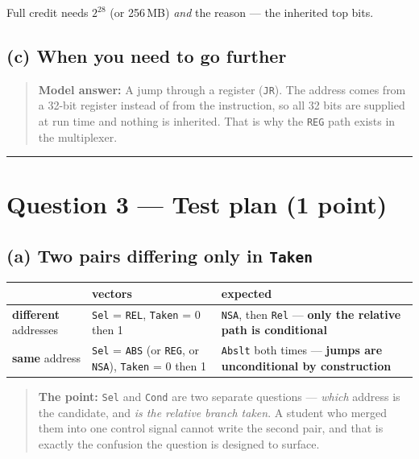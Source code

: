 \documentclass[11pt]{article}
\newcommand{\code}[1]{\texttt{#1}}
\newcommand{\hr}{\vspace{2pt}\hrule\vspace{6pt}}
\begin{document}
Full credit needs $2^{28}$ (or 256\,MB) \emph{and} the reason --- the inherited
top bits.

\subsection*{(c) When you need to go further}

\begin{quote}
\textbf{Model answer:} A jump through a register (\code{JR}). The address comes
from a 32-bit register instead of from the instruction, so all 32 bits are
supplied at run time and nothing is inherited. That is why the \code{REG} path
exists in the multiplexer.
\end{quote}

\vspace{4pt}\hr

\section*{Question 3 --- Test plan (1 point)}

\subsection*{(a) Two pairs differing only in \code{Taken}}

\begin{center}
\small
\begin{tabular}{l>{\raggedright\arraybackslash}p{5.0cm}>{\raggedright\arraybackslash}p{6.4cm}}
\toprule
& vectors & expected \\
\midrule
\textbf{different} addresses & \code{Sel} = \code{REL}, \code{Taken} = 0 then 1 & \code{NSA}, then \code{Rel} --- \textbf{only the relative path is conditional} \\
\textbf{same} address & \code{Sel} = \code{ABS} (or \code{REG}, or \code{NSA}), \code{Taken} = 0 then 1 & \code{Abslt} both times --- \textbf{jumps are unconditional by construction} \\
\bottomrule
\end{tabular}
\end{center}

\begin{quote}
\textbf{The point:} \code{Sel} and \code{Cond} are two separate questions ---
\emph{which} address is the candidate, and \emph{is the relative branch taken}. A
student who merged them into one control signal cannot write the second pair, and
that is exactly the confusion the question is designed to surface.
\end{quote}
\end{document}
